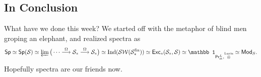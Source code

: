 \subsection*{In Conclusion} 
What have we done this week? We started off with the metaphor of blind men groping an elephant, and realized spectra as \[
    \mathsf{Sp} \simeq  \mathsf{Sp} (\mathcal{S} ) \simeq  \varprojlim \big( \cdots \overset{\Omega}{\longrightarrow} \mathcal{S} _*\overset{\Omega}{\longrightarrow} \mathcal{S} _*\big) \simeq  \mathrm{Ind}(\mathcal{SW} (\mathcal{S} _*^{\mathrm{fin}})) \simeq \mathsf{Exc} _*(\mathcal{S} _*,\mathcal{S} ) \simeq \mathbb 1 _{\mathsf{Pr} ^L_{\mathrm{st}},\overset{\text{Lurie} }{\otimes} } \simeq \mathsf{Mod} _S.
\] Hopefully spectra are our friends now.
\orbreak
